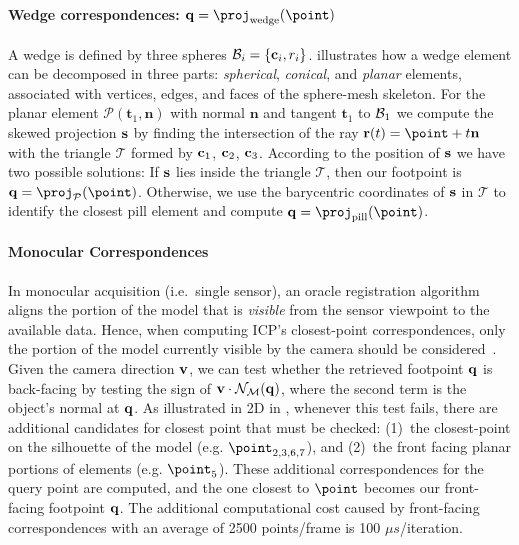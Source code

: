 \paragraph{Wedge correspondences: $\footpoint=\proj_\text{wedge}(\point)$}
A wedge is defined by three spheres $\mathcal{B}_i = \{\mathbf{c}_i, r_i\}$.   illustrates how a wedge element can be decomposed in three parts: \emph{spherical}, \emph{conical}, and \emph{planar} elements, associated with vertices, edges, and faces of the sphere-mesh skeleton. For the planar element $\mathcal{P}(\mathbf{t}_1,\mathbf{n})$ with normal $\mathbf{n}$ and tangent $\mathbf{t}_1$ to $\mathcal{B}_1$
%
we compute the skewed projection $\mathbf{s}$ by finding the intersection of the ray $\mathbf{r}(t) = \point + t\mathbf{n}$ with the triangle $\mathcal{T}$ formed by $\mathbf{c}_1$, $\mathbf{c}_2$, $\mathbf{c}_3$. 
% 
According to the position of $\mathbf{s}$ we have two possible solutions:
If $\mathbf{s}$ lies inside the triangle $\mathcal{T}$, then our footpoint is $\footpoint = \proj_\mathcal{P}(\point)$. Otherwise, we use the barycentric coordinates of $\mathbf{s}$ in $\mathcal{T}$ to identify the closest pill element and compute $\footpoint=\proj_\text{pill}(\point)$.

\paragraph{Monocular Correspondences}
In monocular acquisition (i.e.\ single sensor), an oracle registration algorithm aligns the portion of the model that is \emph{visible} from the sensor viewpoint to the available data. Hence, when computing ICP's closest-point correspondences, only the portion of the model currently visible by the camera should be considered~\cite{tagliasacchi2015robust}. Given the camera direction $\mathbf{v}$, we can test whether the retrieved footpoint $\mathbf{q}$ is back-facing by testing the sign of $\mathbf{v} \cdot \mathcal{N}_{\mathcal{M}}(\mathbf{q})$, where the second term is the object's normal at $\mathbf{q}$. As illustrated in 2D in , whenever this test fails, there are additional candidates for closest point that must be checked: (1)~the closest-point on the silhouette of the model (e.g. $\point_{2,3,6,7}$), and (2)~the front facing planar portions of elements (e.g. $\point_{5}$). These additional correspondences for the query point are computed, and the one closest to $\point$ becomes our front-facing footpoint $\mathbf{q}$. The additional computational cost caused by front-facing correspondences with an average of 2500 points/frame is 100 $\mu s$/iteration.

